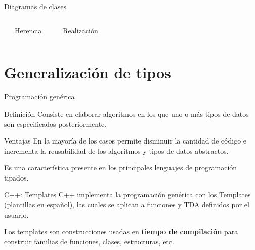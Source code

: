 \documentclass[aspectratio=169]{beamer}
\begin{document}
\begin{frame}{Diagramas de clases}
\begin{columns}
  \begin{center}
  \end{center}
  \begin{center}
    Herencia
  \end{center}
  \begin{center}
  \end{center}
  \begin{center}
    Realización
  \end{center}
\end{columns}
\end{frame}

\section{Generalización de tipos}

\begin{frame}{Programación genérica}
  \begin{block}{Definición}
    Consiste en elaborar algoritmos en los que uno o más tipos de datos son especificados posteriormente. 
  \end{block}
  
  \begin{block}{Ventajas}
    En la mayoría de los casos permite disminuir la cantidad de código e incrementa la reusabilidad de los algoritmos y tipos de datos abstractos.
    
    Es una característica presente en los principales lenguajes de programación tipados.
  \end{block}
  
  \begin{block}{C++: Templates}
    C++ implementa la programación genérica con los \alert{Templates} (plantillas en español), las cuales se aplican a funciones y TDA definidos por el usuario.
  
    Los templates son construcciones usadas en \textbf{tiempo de compilación} para construir familias de funciones, clases, estructuras, etc.
  \end{block}
\end{frame}
\end{document}
